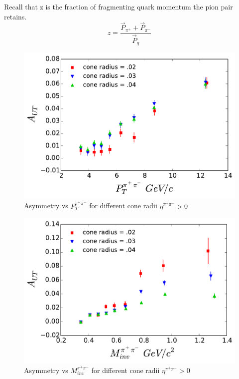 \documentclass[abstract = on,listof=totoc, bibliography=totoc]{scrreprt}
\newcommand{\ptpair}{P_{T}^{\pi^+\pi^-}}
\newcommand{\mpair}{M_{inv}^{\pi^+\pi^-}}
\newcommand{\etapair}{\eta^{\pi^+\pi^-}}
\newcommand{\pip}{\pi^+}
\newcommand{\pim}{\pi^-}
\begin{document}
Recall that z is the fraction of fragmenting quark momentum the pion pair retains.
\begin{equation}
\label{eq:mptrelate}
z = \frac{\vec{P}_{\pip} + \vec{P}_{\pim}}{\vec{P}_q}
\end{equation}
%

\begin{figure}
\begin{center}
\includegraphics[width = .8\textwidth]{allConeAsymsVs_Pt_8_24_15_HiEta}
\caption[Asymmetry vs $\ptpair$ for different cone radii]{Asymmetry vs $\ptpair$ for different cone radii $\etapair > 0$}
\label{fig:allConesPt}
\end{center}
\end{figure}

\begin{figure}
\begin{center}
\includegraphics[width = .8\textwidth]{allConeAsymsVs_Mass_8_24_15_HiEta}
\caption[Asymmetry vs $\mpair$ for different cone radii]{Asymmetry vs $\mpair$ for different cone radii $\etapair > 0$}
\label{fig:allConesMass}
\end{center}
\end{figure}
\end{document}

